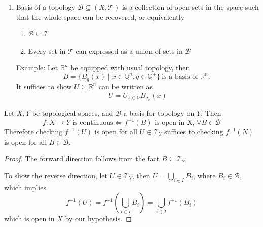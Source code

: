\begin{enumerate}
\begin{proof}
Construct $U=(1-\delta,1]$ for $\delta\le1$, and therfore $f^{-1}((1-\delta,1])$ is open, and therfore for the point $x=f^{-1}(1)$, there exists $\varepsilon>0$ such that
\[
B_{\varepsilon}(x)\subseteq f^{-1}((1-\delta,1])
\implies
[x-\varepsilon,x)\subseteq f^{-1}((1-\delta,1)),
\text{ and }
(x,x+\varepsilon]\subseteq f^{-1}((1-\delta,1)).
\]
which implies that there exists $a,b$ such that $[x-\varepsilon,x)=f^{-1}((a,1))$ and $(x,x+\varepsilon]=f^{-1}((b,1))$, i.e., $f^{-1}((a,b)\cap(b,1))$ admits into two values in $[x-\varepsilon,x)$ and $(x,x+\varepsilon]$, which is a contradiction.
\end{proof}
\item
Basis of a topology $\mathcal{B}\subseteq(X,\mathcal{T})$ is a collection of open sets in the space such that the whole space can be recovered, or equivalently
\begin{enumerate}
\item
$\mathcal{B}\subseteq\mathcal{T}$
\item
Every set in $\mathcal{T}$ can expressed as a union of sets in $\mathcal{B}$
\end{enumerate}
Example: Let $\mathbb{R}^n$ be equipped with usual topology, then
\[
B=\{B_q(x)\mid x\in\mathbb{Q}^n,q\in\mathbb{Q}^+\}\ \text{is a basis of $\mathbb{R}^n$. }
\]
It suffices to show $U\subseteq\mathbb{R}^n$ can be written as 
\[
U=U_{x\in\mathbb{Q}}B_{q_x}(x)
\]
\end{enumerate}

\begin{proposition}
Let $X,Y$ be topological spaces, and $\mathcal{B}$ a basis for topology on $Y$. Then
\[
f:X\to Y\text{ is continuous}
\Longleftrightarrow
f^{-1}(B)\text{ is open in X, }\forall B\in\mathcal{B}
\]
Therefore checking $f^{-1}(U)$ is open for all $U\in\mathcal{T}_Y$ suffices to checking $f^{-1}(N)$ is open for all $B\in\mathcal{B}$.
\end{proposition}

\begin{proof}
The forward direction follows from the fact $B\subseteq\mathcal{T}_Y$.

To show the reverse direction, let $U\in\mathcal{T}_Y$, then $U=\bigcup_{i\in I}B_i$, where $B_i\in\mathcal{B}$, which implies
\[
f^{-1}(U)=f^{-1}\left(
\bigcup_{i\in I}B_i
\right)
=
\bigcup_{i\in I}f^{-1}(B_i)
\]
which is open in $X$ by our hypothesis.
\end{proof}

